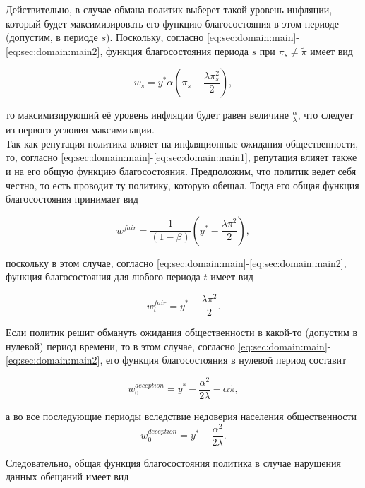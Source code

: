Действительно, в случае обмана политик выберет такой уровень инфляции, который будет максимизировать его функцию благосостояния в этом периоде (допустим, в периоде $s$). Поскольку, согласно \eqref{eq:sec:domain:main}-\eqref{eq:sec:domain:main2}, функция благосостояния периода $s$ при $\pi_s\ne\tilde{\pi}$ имеет вид

\begin{equation}
	\label{eq:sec:domain:main3}
	w_s=y^*\alpha\left(\pi_s - \frac{\lambda\pi^2_s}{2} \right),
\end{equation}

то максимизирующий её уровень инфляции будет равен величине $\frac{\alpha}{\lambda}$, что следует из первого условия максимизации.\\

Так как репутация политика влияет на инфляционные ожидания общественности, то, согласно  \eqref{eq:sec:domain:main}-\eqref{eq:sec:domain:main1}, репутация влияет также и на его общую функцию благосостояния. Предположим, что политик ведет себя честно, то есть проводит ту политику, которую обещал. Тогда его общая функция благосостояния принимает вид

\begin{equation}
	w^{fair} = \frac{1}{(1-\beta)} \left( y^*-\frac{\lambda\pi^2}{2} \right),
\end{equation}

поскольку в этом случае, согласно \eqref{eq:sec:domain:main}-\eqref{eq:sec:domain:main2},  функция благосостояния для любого периода $t$ имеет вид

\begin{equation}
w^{fair}_t = y^*-\frac{\lambda\pi^2}{2}.
\end{equation}

Если политик решит обмануть ожидания общественности в какой-то (допустим в нулевой) период времени, то в этом случае, согласно \eqref{eq:sec:domain:main}-\eqref{eq:sec:domain:main2}, его функция благосостояния в нулевой период составит

\begin{equation}
w^{deception}_0 = y^*-\frac{\alpha^2}{2\lambda}-\alpha\tilde{\pi},
\end{equation}

а во все последующие периоды вследствие недоверия населения общественности
\begin{equation}
w^{deception}_0 = y^*-\frac{\alpha^2}{2\lambda}.
\end{equation}

Следовательно, общая функция благосостояния политика в случае нарушения данных обещаний имеет вид


